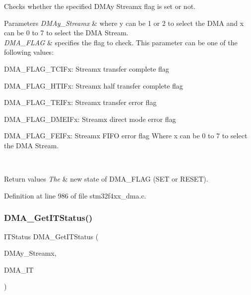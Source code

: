 Checks whether the specified D\+M\+Ay Streamx flag is set or not. 


\begin{DoxyParams}{Parameters}
{\em D\+M\+Ay\+\_\+\+Streamx} & where y can be 1 or 2 to select the D\+MA and x can be 0 to 7 to select the D\+MA Stream. \\
\hline
{\em D\+M\+A\+\_\+\+F\+L\+AG} & specifies the flag to check. This parameter can be one of the following values\+: \begin{DoxyItemize}
\item D\+M\+A\+\_\+\+F\+L\+A\+G\+\_\+\+T\+C\+I\+Fx\+: Streamx transfer complete flag \item D\+M\+A\+\_\+\+F\+L\+A\+G\+\_\+\+H\+T\+I\+Fx\+: Streamx half transfer complete flag \item D\+M\+A\+\_\+\+F\+L\+A\+G\+\_\+\+T\+E\+I\+Fx\+: Streamx transfer error flag \item D\+M\+A\+\_\+\+F\+L\+A\+G\+\_\+\+D\+M\+E\+I\+Fx\+: Streamx direct mode error flag \item D\+M\+A\+\_\+\+F\+L\+A\+G\+\_\+\+F\+E\+I\+Fx\+: Streamx F\+I\+FO error flag Where x can be 0 to 7 to select the D\+MA Stream. \end{DoxyItemize}
\\
\hline
\end{DoxyParams}

\begin{DoxyRetVals}{Return values}
{\em The} & new state of D\+M\+A\+\_\+\+F\+L\+AG (S\+ET or R\+E\+S\+ET). \\
\hline
\end{DoxyRetVals}


Definition at line 986 of file stm32f4xx\+\_\+dma.\+c.

\mbox{\label{group___d_m_a___group4_gad0ccf5f6548bd7cf8f2cae30393bb716}} 
\subsubsection{\texorpdfstring{D\+M\+A\+\_\+\+Get\+I\+T\+Status()}{DMA\_GetITStatus()}}
{\footnotesize\ttfamily I\+T\+Status D\+M\+A\+\_\+\+Get\+I\+T\+Status (\begin{DoxyParamCaption}\item[{\hyperlink{struct_d_m_a___stream___type_def}{D\+M\+A\+\_\+\+Stream\+\_\+\+Type\+Def} $\ast$}]{D\+M\+Ay\+\_\+\+Streamx,  }\item[{uint32\+\_\+t}]{D\+M\+A\+\_\+\+IT }\end{DoxyParamCaption})}




